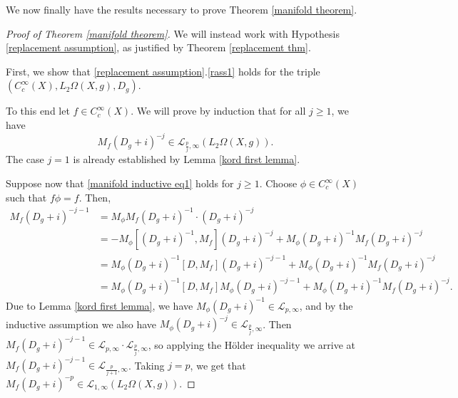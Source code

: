     We now finally have the results necessary to prove Theorem \ref{manifold theorem}.
    \begin{proof}[Proof of Theorem \ref{manifold theorem}] 
        We will instead work with Hypothesis \ref{replacement assumption}, as justified by Theorem \ref{replacement thm}. 
                
        First, we show that \ref{replacement assumption}.\eqref{rass1} holds
        for the triple $(C^\infty_c(X),L_2\Omega(X,g),D_g)$.
        
        To this end let $f \in C^\infty_c(X)$.
        We will prove by induction that for all $j\geq 1$, we have
        \begin{equation}\label{manifold inductive eq1}
            M_f(D_g+i)^{-j} \in \mathcal{L}_{\frac{p}{j},\infty}(L_2\Omega(X,g)).
        \end{equation}
        The case $j=1$ is already established by Lemma \ref{kord first lemma}. 
        
        Suppose now that \eqref{manifold inductive eq1} holds for $j \geq 1$. Choose $\phi \in C^\infty_c(X)$ such that $f\phi = f$. Then,
        \begin{align*}
            M_f(D_g+i)^{-j-1} &= M_{\phi}M_f(D_g+i)^{-1}\cdot (D_g+i)^{-j}\\
                              &= -M_{\phi}[(D_g+i)^{-1},M_f](D_g+i)^{-j}+M_{\phi}(D_g+i)^{-1}M_f(D_g+i)^{-j}\\
                              &= M_{\phi}(D_g+i)^{-1}[D,M_f](D_g+i)^{-j-1}+M_{\phi}(D_g+i)^{-1}M_f(D_g+i)^{-j}\\
                              &= M_{\phi}(D_g+i)^{-1}[D,M_f]M_{\phi}(D_g+i)^{-j-1}+M_{\phi}(D_g+i)^{-1}M_f(D_g+i)^{-j}.
        \end{align*}
        Due to Lemma \ref{kord first lemma}, we have $M_{\phi}(D_g+i)^{-1} \in \mathcal{L}_{p,\infty}$, and by the inductive assumption
        we also have $M_{\phi}(D_g+i)^{-j} \in \mathcal{L}_{\frac{p}{j},\infty}$. Then $M_f(D_g+i)^{-j-1} \in \mathcal{L}_{p,\infty}\cdot \mathcal{L}_{\frac{p}{j},\infty}$,
        so applying the H\"older inequality we arrive at $M_f(D_g+i)^{-j-1} \in \mathcal{L}_{\frac{p}{j+1},\infty}$. Taking $j = p$, we get that $M_f(D_g+i)^{-p} \in \mathcal{L}_{1,\infty}(L_2\Omega(X,g))$.
        

\end{proof}
